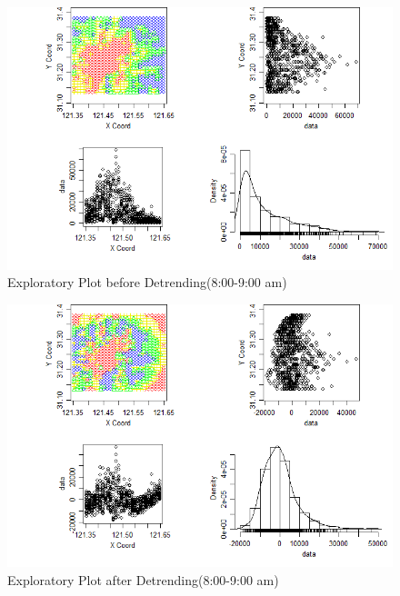 \documentclass[hidelinks,12pt]{article}
\begin{document}
\begin{figure}[!ht]
		\includegraphics[width=\textwidth]{geo8.png}
		\caption{Exploratory Plot before Detrending(8:00-9:00 am) \label{fig:geo8}}
\end{figure}
\FloatBarrier

\begin{figure}[!ht]
		\includegraphics[width=\textwidth]{gres8.png}
		\caption{Exploratory Plot after Detrending(8:00-9:00 am)\label{fig:gres8}}
\end{figure}
\FloatBarrier
\end{document}

